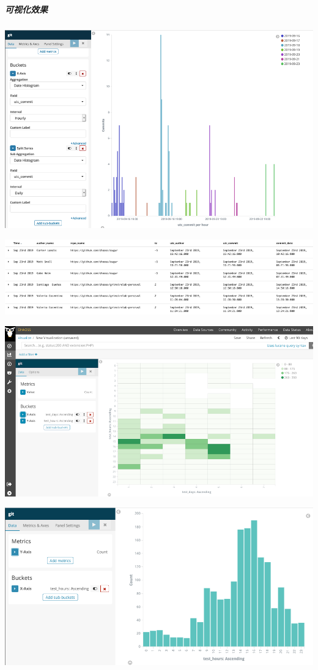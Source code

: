 \hypertarget{ux53efux89c6ux5316ux6548ux679c}{%
\subparagraph{可视化效果}\label{ux53efux89c6ux5316ux6548ux679c}}

\includegraphics{images/activity-dates-and-times_1.png}

\includegraphics{images/activity-dates-and-times_2.png}

\includegraphics{images/activity-dates-and-times_3.png}

\includegraphics{images/activity-dates-and-times_4.png}

